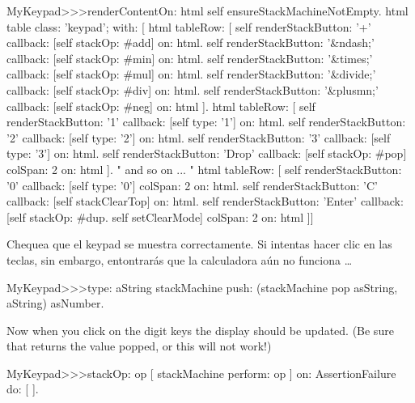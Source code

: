 \documentclass[a4paper,10pt,twoside]{book}
\begin{document}
\begin{code}{}
MyKeypad>>>renderContentOn: html 
  self ensureStackMachineNotEmpty.
  html table
    class: 'keypad';
    with: [
      html tableRow: [
          self renderStackButton: '+' callback: [self stackOp: #add] on: html.
          self renderStackButton: '&ndash;' callback: [self stackOp: #min] on: html.
          self renderStackButton: '&times;' callback: [self stackOp: #mul] on: html.
          self renderStackButton: '&divide;' callback: [self stackOp: #div] on: html.
          self renderStackButton: '&plusmn;' callback: [self stackOp: #neg] on: html ].
        html tableRow: [
          self renderStackButton: '1' callback: [self type: '1'] on: html.
          self renderStackButton: '2' callback: [self type: '2'] on: html.
          self renderStackButton: '3' callback: [self type: '3'] on: html.
          self renderStackButton: 'Drop' callback: [self stackOp: #pop]
          	colSpan: 2 on: html ].
" and so on ... "
        html tableRow: [
          self renderStackButton: '0' callback: [self type: '0'] colSpan: 2 on: html.
          self renderStackButton: 'C' callback: [self stackClearTop] on: html.
          self renderStackButton: 'Enter'
          	callback: [self stackOp: #dup. self setClearMode]
			colSpan: 2 on: html ]]
\end{code}

Chequea que el keypad se muestra correctamente.
Si intentas hacer clic en las teclas, sin embargo, entontrar\'as que la calculadora a\'un no funciona \ldots{}


\begin{code}{}
MyKeypad>>>type: aString
	stackMachine push: (stackMachine pop asString, aString) asNumber.
\end{code}
Now when you click on the digit keys the display should be updated.
(Be sure that  returns the value popped, or this will not work!)



\begin{code}{}
MyKeypad>>>stackOp: op
	[ stackMachine perform: op ] on: AssertionFailure do: [ ].
\end{code}
\end{document}
